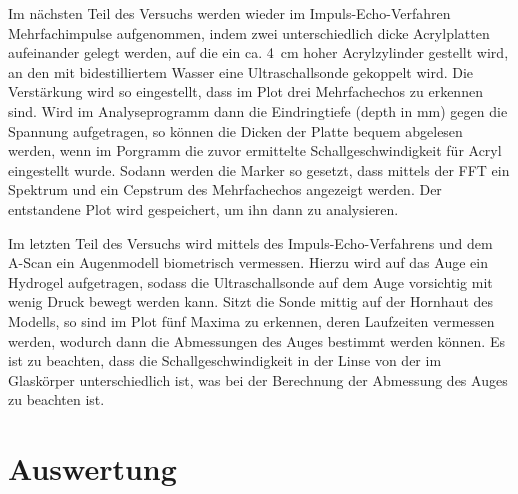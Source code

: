 \noindent Im nächsten Teil des Versuchs werden wieder im Impuls-Echo-Verfahren Mehrfachimpulse aufgenommen, indem zwei unterschiedlich dicke Acrylplatten
aufeinander gelegt werden, auf die ein ca. \SI{4}{\centi \metre} hoher Acrylzylinder gestellt wird, an den mit bidestilliertem Wasser eine
Ultraschallsonde gekoppelt wird. Die Verstärkung wird so eingestellt, dass im Plot drei Mehrfachechos zu erkennen sind. Wird im Analyseprogramm
dann die Eindringtiefe (depth in \si{\milli \metre}) gegen die Spannung aufgetragen, so können die Dicken der Platte bequem abgelesen werden, wenn
im Porgramm die zuvor ermittelte Schallgeschwindigkeit für Acryl eingestellt wurde.
Sodann werden die Marker so gesetzt, dass mittels der FFT ein Spektrum und ein Cepstrum des Mehrfachechos angezeigt werden. Der entstandene
Plot wird gespeichert, um ihn dann zu analysieren.


\noindent Im letzten Teil des Versuchs wird mittels des Impuls-Echo-Verfahrens und dem A-Scan ein Augenmodell biometrisch vermessen. Hierzu wird auf das Auge ein Hydrogel aufgetragen, sodass
die Ultraschallsonde auf dem Auge vorsichtig mit wenig Druck bewegt werden kann. Sitzt die Sonde mittig auf der Hornhaut des Modells,
so sind im Plot fünf Maxima zu erkennen, deren Laufzeiten vermessen werden, wodurch dann die Abmessungen des Auges bestimmt werden können.
Es ist zu beachten, dass die Schallgeschwindigkeit in der Linse von der im Glaskörper unterschiedlich ist, was bei der Berechnung der
Abmessung des Auges zu beachten ist.


\section{Auswertung}

